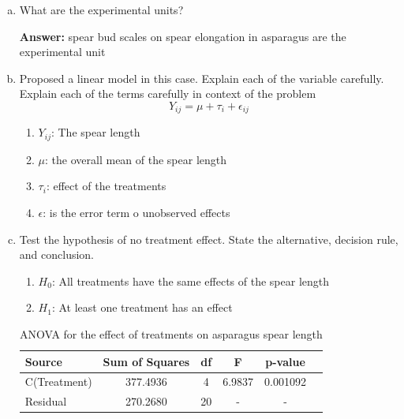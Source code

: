 \documentclass{article}
\begin{document}
\begin{enumerate}[(a)]
	\item What are the experimental units?

	      \textbf{Answer:} spear bud scales on spear elongation in asparagus are the experimental unit
	\item Proposed a linear model in this case. Explain each of the variable carefully.
	      Explain each of the terms carefully in context of the problem
	      $$
		      Y_{ij}= \mu + \tau_i + \epsilon_{ij}
	      $$
	      \begin{enumerate}
		      \item $Y_{ij}$: The spear length
		      \item $\mu$: the overall mean of the spear length
		      \item $\tau_i$: effect of the treatments
		      \item $\epsilon$: is the error term o unobserved effects
	      \end{enumerate}
	\item Test the hypothesis of no treatment effect. State the alternative, decision rule, and conclusion.
	      \begin{enumerate}
		      \item $H_0$: All treatments have the same effects of the spear length
		      \item $H_1$: At least one treatment has an effect
	      \end{enumerate}

	      \begin{table}[!ht]
		      \centering
		      \caption{ANOVA for the effect of treatments on asparagus spear length}
		      \begin{tabular}{lccccc}
			      \hline
			      \textbf{Source} & \textbf{Sum of Squares} & \textbf{df} & \textbf{F} & \textbf{p-value} \\
			      \hline
			      C(Treatment)    & 377.4936                & 4           & 6.9837     & 0.001092         \\
			      Residual        & 270.2680                & 20          & -          & -                \\
			      \hline
		      \end{tabular}
	      \end{table}


\end{enumerate}
\end{document}
